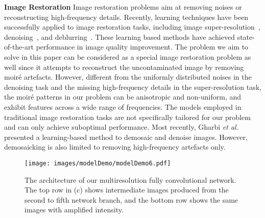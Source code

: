 \documentclass[journal]{IEEEtran}
\providecommand{\shortcite}[1]{\cite{#1}}
\begin{document}
\textbf{Image Restoration} Image restoration problems aim at removing noises or reconstructing high-frequency details. Recently, learning techniques have been successfully applied to image restoration tasks, including image super-resolution~\cite{dong2014learning,kim2016accurate,zhang2017learning}, denoising~\cite{zhang2017beyond,zhang2017learning}, and
deblurring~\cite{nah2016deep,zhang2017learning}. These learning based methods have achieved state-of-the-art performance in image quality improvement. The problem we aim to solve in this paper can be considered as a special image restoration problem as well since it attempts to reconstruct the uncontaminated image by removing moir\'{e} artefacts. However, different from the uniformly distributed noises in the denoising task and the missing high-frequency details in the super-resolution task, the moir\'{e} patterns in our problem can be anisotropic and non-uniform, and exhibit features across a wide range of frequencies. The models employed in traditional image restoration tasks are not specifically tailored for our problem and can only achieve suboptimal performance. Most recently, Gharbi {\em et al.}~\shortcite{demosaick2016deep} presented a learning-based method to demosaic and denoise images. However, demosaicking is also limited to removing high-frequency artefacts only.


\begin{figure*}[t]
\begin{center}
 \texttt{[image: images/modelDemo/modelDemo6.pdf]}
\end{center}

\begin{center}
\hspace{-.5em}
 \hspace{-.6em}
 \hspace{-.6em}
 \hspace{-.6em}
\end{center}
 \caption{The architecture of our multiresolution fully convolutional network. The top row in (c) shows intermediate images produced from the second to fifth network branch, and the bottom row shows the same images with amplified intensity.}
\label{fig:modeldemo}
\end{figure*}
\end{document}
